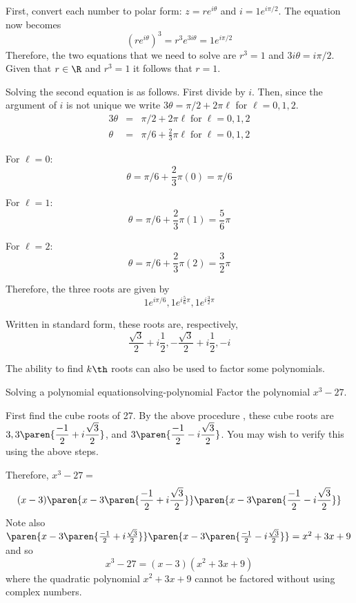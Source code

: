 \begin{solution}
First, convert each number to polar form: $z = re^{i\theta}$ and $i = 1 e^{i \pi/2}$. The equation now becomes
\[
(re^{i\theta})^3 = r^3 e^{3i\theta} = 1 e^{i \pi/2}
\]
Therefore, the two equations that we need to solve are $r^3 = 1$ and $3i\theta = i \pi/2$. Given that $r \in \R$ and $r^3 = 1$ it follows that $r=1$.

Solving the second equation is as follows. First divide by $i$. Then, since the argument of $i$ is not unique we write $3\theta = \pi/2 + 2\pi\ell$ for $\ell = 0,1,2$.
\begin{eqnarray*}
3\theta &=& \pi/2 + 2\pi\ell \; \mbox{for} \; \ell = 0,1,2 \\
\theta &=& \pi/6 + \frac{2}{3} \pi\ell \; \mbox{for} \; \ell = 0,1,2
\end{eqnarray*}

For $\ell = 0$:
\[
\theta = \pi/6 + \frac{2}{3} \pi (0) = \pi/6
\]

For $\ell = 1$:
\[
\theta = \pi/6 + \frac{2}{3} \pi(1) = \frac{5}{6} \pi
\]

For $\ell = 2$:
\[
\theta = \pi/6 + \frac{2}{3} \pi(2) = \frac{3}{2} \pi
\]

Therefore, the three roots are given by \[
1e^{i \pi/6}, 1e^{i \frac{5}{6}\pi}, 1e^{i \frac{3}{2}\pi}
\]

Written in standard form, these roots are, respectively,
\[
\frac{\sqrt{3}}{2} + i \frac{1}{2}, -\frac{\sqrt{3}}{2} + i \frac{1}{2}, -i
\]

\end{solution}

The ability to find $k\th$ roots can also be used to factor some
polynomials.

\begin{example}{Solving a polynomial equation}{solving-polynomial}
Factor the polynomial $x^{3}-27$.
\end{example}

\begin{solution}
First find the cube roots of 27. By the above procedure
, these cube roots
are $3,3\paren{\displaystyle
\frac{-1}{2}+i\displaystyle\frac{\sqrt{3}}{2}}$, and $3\paren{
\displaystyle\frac{-1}{2}-i\displaystyle\frac{\sqrt{3}}{2}}$. You may wish to verify
this using the above steps.

Therefore, $x^{3}-27 =$
\begin{equation*}
 (x-3) \paren{x-3\paren{\frac{-1}{2}+i\frac{\sqrt{3}}{2}}
} \paren{x-3\paren{\frac{-1}{2}-i\frac{\sqrt{3}}{2}}}
\end{equation*}
Note also $\paren{x-3\paren{\frac{-1}{2}+i\frac{\sqrt{3}}{2}}}
\paren{x-3\paren{\frac{-1}{2}-i\frac{\sqrt{3}}{2}}}
=\allowbreak x^{2}+3x+9$ and so
\begin{equation*}
x^{3}-27=(x-3) (x^{2}+3x+9)
\end{equation*}
where the quadratic polynomial $x^{2}+3x+9$ cannot be factored without using
complex numbers.
\end{solution}

